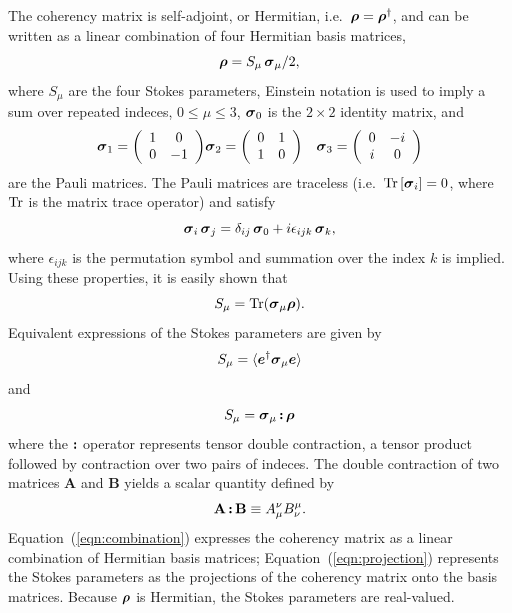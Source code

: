 \documentclass[twocolumn]{aastex6}
\newcommand{\mbf}[1]{\mbox{\boldmath $#1$}}
\newcommand{\Eqn}[1]{Equation~(\ref{eqn:#1})}
\newcommand{\Ci}{\ensuremath{i}}
\newcommand{\irow}{\mu} \newcommand{\icol}{\nu}
\newcommand{\trace}{{\rm Tr}}
\newcommand{\tr}[1]{\trace\ensuremath{ \left[ {#1} \right] }}
\newcommand{\dc}[2]{\ensuremath{{#1}\,\mbf{:}\,{#2}}}
\newcommand{\pauli}[1]{\ensuremath{\mbf{\sigma}_{#1}}}
\begin{document}
The coherency matrix is self-adjoint, or Hermitian,
i.e.\ $\mbf{\rho}=\mbf{\rho}^\dagger$, and can be written as a linear
combination of four Hermitian basis matrices,
%
\begin{equation}
  {\mbf\rho} = S_\irow\,\pauli{\irow} / 2,    \label{eqn:combination}
\end{equation}
where $S_\irow$ are the four Stokes parameters, Einstein
notation is used to imply a sum over repeated indeces,
$0\le\irow\le3$, $\pauli{0}$ is the $2\times2$ identity matrix, and
\begin{eqnarray}
{\mbf{\sigma}_1} = \left( \begin{array}{cc}
1 & 0 \\
0 & -1 
\end{array}\right)
&
\mbf{\sigma}_2 = \left( \begin{array}{cc}
0 & 1 \\
1 & 0 
\end{array}\right)
& 
\mbf{\sigma}_3 = \left( \begin{array}{cc}
0 & -\Ci \\
\Ci & 0
\end{array}\right)
\label{pauli}
\end{eqnarray}
%
are the Pauli matrices.  The Pauli matrices are traceless
(i.e.\ $\tr{\pauli{i}}=0$, where $\trace$ is the matrix trace
operator) and satisfy
\begin{equation}
\pauli{i}\,\pauli{j} = \delta_{ij}\,\pauli{0} + i\epsilon_{ijk}\,\pauli{k},
\end{equation}
where $\epsilon_{ijk}$ is the permutation symbol and summation over
the index $k$ is implied.  Using these properties, it is easily shown that
%
\begin{equation}
S_\irow = \trace(\pauli{\irow}\mbf{\rho}).  \label{eqn:trace}
\end{equation}
%
Equivalent expressions of the Stokes parameters are given by
%
\begin{equation}
S_\irow = \langle \mbf{e}^\dagger \pauli{\irow} \mbf{e} \rangle \label{eqn:inner}
\end{equation}
and
\begin{equation}
S_\irow = \dc{\pauli{\irow}}{\mbf\rho}     \label{eqn:projection}
\end{equation}
%
where the $\mbf{:}$ operator represents tensor double contraction, a
tensor product followed by contraction over two pairs of indeces.  The
double contraction of two matrices {\bf A} and {\bf B} yields a scalar
quantity defined by
%
\begin{equation}
\dc{\bf A}{\bf B} \equiv A_\mu^\nu B_\nu^\mu.
\label{eqn:double_contraction_matrices}
\end{equation}
%
\Eqn{combination} expresses the coherency matrix as a linear
combination of Hermitian basis matrices; \Eqn{projection} represents
the Stokes parameters as the projections of the coherency matrix onto
the basis matrices.  Because $\mbf\rho$ is Hermitian, the Stokes
parameters are real-valued.  
%
\end{document}
